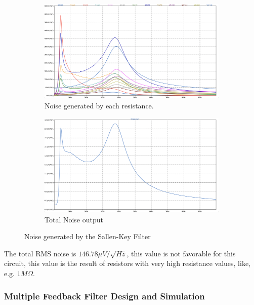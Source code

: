 \begin{figure}[H]
    \centering
    \begin{subfigure}{0.45\textwidth}
        \includegraphics*[width=\textwidth]{Images/NoiseResSK.png}
        \caption{Noise generated by each resistance.}
        \label{fig:NoiseResSk}  
    \end{subfigure}
    \begin{subfigure}{0.45\textwidth}
        \includegraphics*[width=\textwidth]{Images/NoiseTotalSK.png}
        \caption{Total Noise output}
        \label{fig:NoiseTotalSK}    
    \end{subfigure}
    \caption{Noise generated by the Sallen-Key Filter}
    \label{fig:NoiseSK}
\end{figure}

The total RMS noise is $146.78 \mu V / \sqrt{Hz}$, this value is not favorable for this circuit, this value is the result of resistors with very high resistance values, like, e.g. $1M\Omega$.

\subsubsection{Multiple Feedback Filter Design and Simulation}

